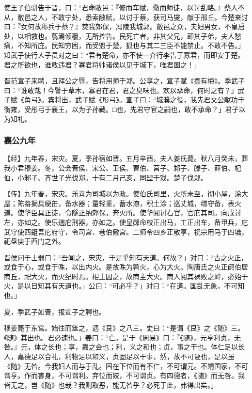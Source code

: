 \documentclass[]{article}
\begin{document}
使王子伯骈告于晋，曰：``君命敝邑：『修而车赋，儆而师徒，以讨乱略。』蔡人不从，敝邑之人，不敢宁处，悉索敝赋，以讨于蔡，获司马燮，献于邢丘。今楚来讨曰：『女何故称兵于蔡？』焚我郊保，冯陵我城郭。敝邑之众，夫妇男女，不皇启处，以相救也。翦焉倾覆，无所控告。民死亡者，非其父兄，即其子弟，夫人愁痛，不知所庇。民知穷困，而受盟于楚，狐也与其二三臣不能禁止。不敢不告。」知武子使行人子员对之曰：``君有楚命，亦不使一介行李告于寡君，而即安于楚。君之所欲也，谁敢违君？寡君将帅诸侯以见于城下，唯君图之！」

晋范宣子来聘，且拜公之辱，告将用师于郑。公享之，宣子赋《摽有梅》。季武子曰：``谁敢哉！今譬于草木，寡君在君，君之臭味也。欢以承命，何时之有？」武子赋《角弓》。宾将出，武子赋《彤弓》。宣子曰：``城濮之役，我先君文公献功于衡雍，受彤弓于襄王，以为子孙藏。□也，先君守官之嗣也，敢不承命？」君子以为知礼。

\hypertarget{header-n1915}{%
\subsubsection{襄公九年}\label{header-n1915}}

【经】九年春，宋灾。夏，季孙宿如晋。五月辛酉，夫人姜氏薨。秋八月癸未，葬我小君穆姜。冬，公会晋侯、宋公、卫侯、曹伯、莒子、邾子、滕子、薛伯、杞伯，小邾子、齐世子光伐郑。十有二月己亥，同盟于戏。楚子伐郑。

【传】九年春，宋灾。乐喜为司城以为政。使伯氏司里，火所未至，彻小屋，涂大屋；陈畚挶具绠缶，备水器；量轻重，蓄水潦，积土涂；巡丈城，缮守备，表火道。使华臣具正徒，令隧正纳郊保，奔火所。使华阅讨右官，官庀其司。向戌讨左，亦如之。使乐遄庀刑器，亦如之。使皇郧命校正出马，工正出车，备甲兵，庀武守使西鉏吾庀府守，令司宫、巷伯儆宫。二师令四乡正敬享，祝宗用马于四墉，祀盘庚于西门之外。

晋侯问于士弱曰：``吾闻之，宋灾，于是乎知有天道。何故？」对曰：``古之火正，或食于心，或食于咮，以出内火。是故咮为鹑火，心为大火。陶唐氏之火正阏伯居商丘，祀大火，而火纪时焉。相土因之，故商主大火。商人阅其祸败之衅，必始于火，是以日知其有天道也。」公曰：``可必乎？」对曰：``在道。国乱无象，不可知也。」

夏，季武子如晋，报宣子之聘也。

穆姜薨于东宫。始往而筮之，遇《艮》之八三。史曰：``是谓《艮》之《随》三。《随》其出也。君必速也。」姜曰：``亡。是于《周易》曰：『《随》，元亨利贞，无咎。』元，体之长也；享，嘉之会也；利，义之和也；贞，事之干也。体仁足以长人，嘉德足以合礼，利物足以和义，贞固足以干事，然，故不可诬也，是以虽《随》无咎。今我妇人而与于乱。固在下位而有不仁，不可谓元。不靖国家，不可谓亨。作而害身，不可谓利。弃位而姣，不可谓贞。有四德者，《随》而无咎。我皆无之，岂《随》也哉？我则取恶，能无咎乎？必死于此，弗得出矣。」
\end{document}
